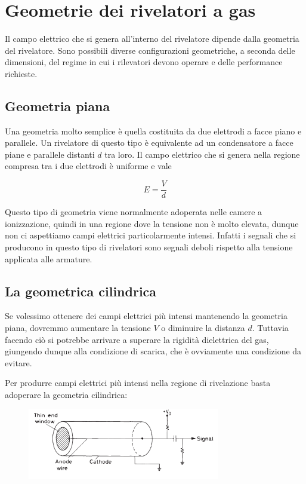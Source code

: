 \section{Geometrie dei rivelatori a gas}

Il campo elettrico che si genera all'interno del rivelatore dipende dalla geometria del rivelatore. Sono possibili diverse configurazioni geometriche, a seconda delle dimensioni, del regime in cui i rilevatori devono operare e delle performance richieste.

\subsection{Geometria piana}
Una geometria molto semplice è quella costituita da due elettrodi a facce piano e parallele. Un rivelatore di questo tipo è equivalente ad un condensatore a facce piane e parallele distanti $d$ tra loro. Il campo elettrico che si genera nella regione compresa tra i due elettrodi è uniforme e vale

\begin{equation*}
   E=\frac{V}{d}
\end{equation*}

Questo tipo di geometria viene normalmente adoperata nelle camere a ionizzazione, quindi in una regione dove la tensione non è molto elevata, dunque non ci aspettiamo campi elettrici particolarmente intensi. Infatti i segnali che si producono in questo tipo di rivelatori sono segnali deboli rispetto alla tensione applicata alle armature.

\subsection{La geometrica cilindrica}
Se volessimo ottenere dei campi elettrici più intensi mantenendo la geometria piana, dovremmo aumentare la tensione $V$ o diminuire la distanza $d$. Tuttavia facendo ciò si potrebbe arrivare a superare la rigidità dielettrica del gas, giungendo dunque alla condizione di scarica, che è ovviamente una condizione da evitare.

Per produrre campi elettrici più intensi nella regione di rivelazione basta adoperare la geometria cilindrica:

\begin{figure}[H]
   \centering
   \includegraphics[width=0.75\textwidth]{immagini/geometria_cilindrica.png}
\end{figure}

